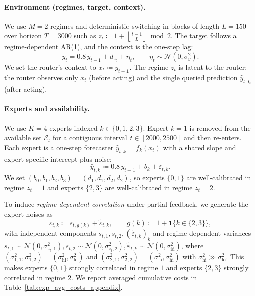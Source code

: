 \paragraph{Environment (regimes, target, context).}
We use \(M=2\) regimes and deterministic switching in blocks of length \(L=150\) over horizon
\(T=3000\) such as $z_t \coloneqq 1 + \left\lfloor \frac{t-1}{L}\right\rfloor \bmod 2$.
The target follows a regime-dependent AR(1), and the context is the one-step lag:
\begin{equation}
\label{eq:exp_tri_cycle_ts_appendix}
y_t = 0.8\,y_{t-1} + d_{z_t} + \eta_t,\qquad \eta_t\sim\mathcal{N}(0,\sigma_y^2).
\end{equation}
We set the router's context to \(x_t\coloneqq y_{t-1}\).
The regime \(z_t\) is latent to the router: the router observes only \(x_t\) (before acting) and the
single queried prediction \(\hat y_{t,I_t}\) (after acting).

\paragraph{Experts and availability.}
We use \(K=4\) experts indexed \(k\in\{0,1,2,3\}\). Expert \(k=1\) is removed from the available set \(\mathcal{E}_t\)
for a contiguous interval \(t\in[2000,2500]\) and then re-enters. Each expert is a one-step forecaster
\(\hat y_{t,k}=f_k(x_t)\) with a shared slope and expert-specific intercept plus noise:
\begin{equation}
\label{eq:exp_synth_expert_rule_appendix}
\hat y_{t,k} \coloneqq 0.8\,y_{t-1} + b_k + \varepsilon_{t,k}.
\end{equation}
We set \((b_0,b_1,b_2,b_3)=(d_1,d_1,d_2,d_2)\), so experts \(\{0,1\}\) are well-calibrated in regime
\(z_t=1\) and experts \(\{2,3\}\) are well-calibrated in regime \(z_t=2\).

To induce \emph{regime-dependent correlation} under partial feedback, we generate the expert noises as
\[
\varepsilon_{t,k} \coloneqq s_{t,g(k)} + \tilde\varepsilon_{t,k},
\qquad
g(k)\coloneqq 1+\mathbf{1}\{k\in\{2,3\}\},
\]
with independent components \(s_{t,1},s_{t,2},(\tilde\varepsilon_{t,k})_{k}\) and regime-dependent
variances $s_{t,1}\sim\mathcal{N}(0,\sigma_{z_t,1}^2), s_{t,2}\sim\mathcal{N}(0,\sigma_{z_t,2}^2),
\tilde\varepsilon_{t,k}\sim\mathcal{N}(0,\sigma_{\mathrm{id}}^2)$, where \((\sigma_{1,1}^2,\sigma_{1,2}^2)=(\sigma_{\mathrm{hi}}^2,\sigma_{\mathrm{lo}}^2)\) and
\((\sigma_{2,1}^2,\sigma_{2,2}^2)=(\sigma_{\mathrm{lo}}^2,\sigma_{\mathrm{hi}}^2)\) with
\(\sigma_{\mathrm{hi}}^2\gg\sigma_{\mathrm{lo}}^2\). This makes experts \(\{0,1\}\) strongly
correlated in regime \(1\) and experts \(\{2,3\}\) strongly correlated in regime \(2\). We report
averaged cumulative costs in Table~\ref{tab:exp_avg_costs_appendix}.


